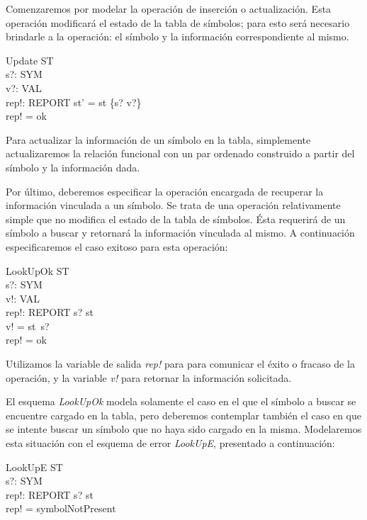 \bigskip
Comenzaremos por modelar la operación de inserción o actualización. Esta operación modificará el estado de la tabla de símbolos; para esto será necesario brindarle a la operación: el símbolo y la información correspondiente al mismo.

\begin{schema}{Update}
  \Delta ST \\
  s?: SYM \\
  v?: VAL \\
  rep!: REPORT
  \where
  st' = st \oplus \{s? \mapsto v?\} \\
  rep! = ok
\end{schema}


Para actualizar la información de un símbolo en la tabla, simplemente actualizaremos la relación funcional con un par ordenado construido a partir del símbolo y la información dada. 

Por último, deberemos especificar la operación encargada de recuperar la información vinculada a un símbolo. Se trata de una operación relativamente simple que no modifica el estado de la tabla de símbolos. Ésta requerirá de un símbolo a buscar y retornará la información vinculada al mismo. A continuación especificaremos el caso exitoso para esta operación:

\begin{schema}{LookUpOk}
\Xi ST \\
s?: SYM \\
v!: VAL \\
rep!: REPORT
\where
s? \in \dom st \\
v! = st~s? \\
rep! = ok
\end{schema} 

Utilizamos la variable de salida \emph{rep!} para para comunicar el éxito o fracaso de la operación, y la variable \emph{v!} para retornar la información solicitada. 

El esquema \emph{LookUpOk} modela solamente el caso en el que el símbolo a buscar se encuentre cargado en la tabla, pero deberemos contemplar también el caso en que se intente buscar un símbolo que no haya sido cargado en la misma. Modelaremos esta situación con el esquema de error \emph{LookUpE}, presentado a continuación:

\begin{schema}{LookUpE}
\Xi ST \\
s?: SYM \\
rep!: REPORT
\where
s? \notin \dom st \\
rep! = symbolNotPresent
\end{schema}

